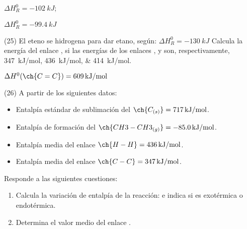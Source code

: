 \documentclass[10pt]{article}
\begin{document}
\begin{multicols}{2}
\begin{exercise}[
    tags    = {},
    topics  = {química,química básica},
    source  = {FQ 1B MGH 2016, p85, e26},
  ]
\end{exercise}

\begin{solution}
  \begin{enumerate*}
    \item \( \Delta H^0_R = \SI{-102}{kJ} \); \item \( \Delta H^0_R = \SI{-99.4}{kJ} \)
  \end{enumerate*}
\end{solution}




\begin{exercise}[
    tags    = {},
    topics  = {química,química básica},
    source  = {FQ 1B MGH 2016, p85, e26},
  ]

  (25) El eteno se hidrogena para dar etano, según:
   \( \Delta H^0_R = \SI{-130}{kJ} \)
  Calcula la energía del enlace , si las energías de los
  enlaces ,  y  son, respectivamente, \SIlist{347;436;414}{kJ/mol}.
\end{exercise}

\begin{solution}
  \( \Delta H^0 (\ch{C=C}) = \SI{609}{kJ/mol} \)
\end{solution}





\begin{exercise}[
    tags    = {},
    topics  = {química,química básica},
    source  = {FQ 1B MGH 2016, p85, e26},
  ]

  (26) A partir de los siguientes datos:
  \begin{itemize}
    \item Entalpía estándar de sublimación del \( \ch{C_{(s)}} = \SI{717}{kJ/mol} \).
    \item Entalpía de formación del \( \ch{CH3-CH3_{(g)}} = \SI{-85,0}{kJ/mol} \).
    \item Entalpía media del enlace \( \ch{H-H} = \SI{436}{kJ/mol} \).
    \item Entalpía media del enlace \( \ch{C-C} = \SI{347}{kJ/mol} \).
  \end{itemize}
  Responde a las siguientes cuestiones:
  \begin{enumerate}
    \item Calcula la variación de entalpía de la reacción:
     e indica si es exotérmica
    o endotérmica.
    \item Determina el valor medio del enlace .
  \end{enumerate}
\end{exercise}


\end{multicols}
\end{document}
